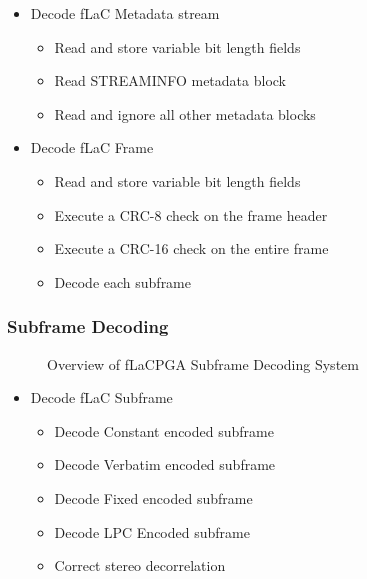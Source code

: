 \documentclass[12pt]{scrartcl}
\begin{document}
  \begin{itemize}
  \item Decode fLaC Metadata stream
    \begin{itemize}
    \item Read and store variable bit length fields
    \item Read STREAMINFO metadata block
    \item Read and ignore all other metadata blocks
    \end{itemize}
  \item Decode fLaC Frame
    \begin{itemize}
    \item Read and store variable bit length fields
    \item Execute a CRC-8 check on the frame header
    \item Execute a CRC-16 check on the entire frame
    \item Decode each subframe
    \end{itemize}
  \end{itemize}
  
  \subsubsection{Subframe Decoding}
  \begin{figure}[H]
    \caption{Overview of fLaCPGA Subframe Decoding System}
    \label{fig:subframe_overview}
  \end{figure}
  
  \begin{itemize}
  \item Decode fLaC Subframe
    \begin{itemize}
    \item Decode Constant encoded subframe
    \item Decode Verbatim encoded subframe
    \item Decode Fixed encoded subframe
    \item Decode LPC Encoded subframe
    \item Correct stereo decorrelation
    \end{itemize}
  \end{itemize}
  
\end{document}
